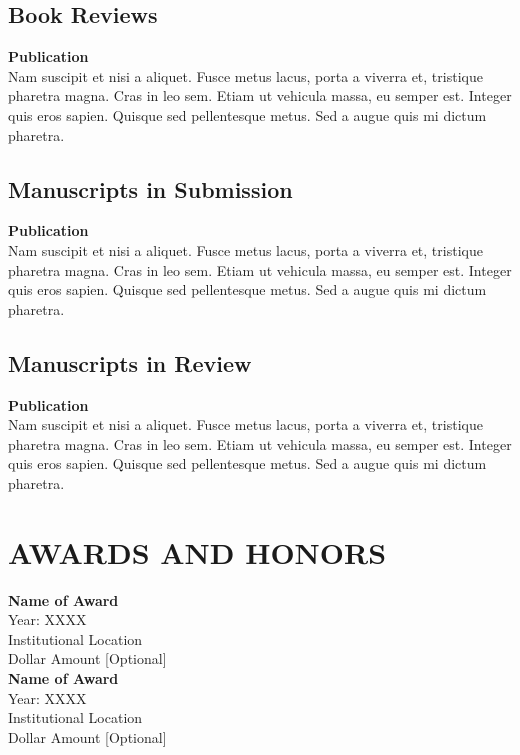 \documentclass[a4paper,9pt]{extarticle}
\begin{document}
\subsection*{Book Reviews}
\textbf{Publication} \\ 
Nam suscipit et nisi a aliquet. Fusce metus lacus, porta a viverra et, tristique pharetra magna. Cras in leo sem. Etiam ut vehicula massa, eu semper est. Integer quis eros sapien. Quisque sed pellentesque metus. Sed a augue quis mi dictum pharetra. 

\subsection*{Manuscripts in Submission}
\textbf{Publication} \\ 
Nam suscipit et nisi a aliquet. Fusce metus lacus, porta a viverra et, tristique pharetra magna. Cras in leo sem. Etiam ut vehicula massa, eu semper est. Integer quis eros sapien. Quisque sed pellentesque metus. Sed a augue quis mi dictum pharetra. 

\subsection*{Manuscripts in Review}
\textbf{Publication} \\ 
Nam suscipit et nisi a aliquet. Fusce metus lacus, porta a viverra et, tristique pharetra magna. Cras in leo sem. Etiam ut vehicula massa, eu semper est. Integer quis eros sapien. Quisque sed pellentesque metus. Sed a augue quis mi dictum pharetra. 


\section*{AWARDS AND HONORS}

\noindent
\newline
\textbf{Name of Award} \\
Year: XXXX \\
Institutional Location \\
Dollar Amount [Optional]  \\

\noindent
\textbf{Name of Award} \\
Year: XXXX \\
Institutional Location \\
Dollar Amount [Optional]  \\
\end{document}
